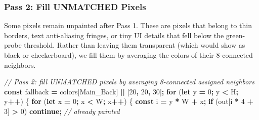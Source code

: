 \documentclass[
  11pt,
  oneside]{report}
\newenvironment{Shaded}{\begin{snugshade}}{\end{snugshade}}
\newcommand{\CommentTok}[1]{\textcolor[rgb]{0.56,0.35,0.01}{\textit{#1}}}
\newcommand{\ControlFlowTok}[1]{\textcolor[rgb]{0.13,0.29,0.53}{\textbf{#1}}}
\newcommand{\DecValTok}[1]{\textcolor[rgb]{0.00,0.00,0.81}{#1}}
\newcommand{\KeywordTok}[1]{\textcolor[rgb]{0.13,0.29,0.53}{\textbf{#1}}}
\newcommand{\NormalTok}[1]{#1}
\newcommand{\OperatorTok}[1]{\textcolor[rgb]{0.81,0.36,0.00}{\textbf{#1}}}
\newcommand{\StringTok}[1]{\textcolor[rgb]{0.31,0.60,0.02}{#1}}
\begin{document}
\subsubsection{Pass 2: Fill UNMATCHED
Pixels}\label{pass-2-fill-unmatched-pixels}

Some pixels remain unpainted after Pass 1. These are pixels that belong
to thin borders, text anti-aliasing fringes, or tiny UI details that
fell below the green-probe threshold. Rather than leaving them
transparent (which would show as black or checkerboard), we fill them by
averaging the colors of their 8-connected neighbors.

\begin{Shaded}
\begin{Highlighting}[]
\CommentTok{// Pass 2: fill UNMATCHED pixels by averaging 8{-}connected assigned neighbors}
\KeywordTok{const}\NormalTok{ fallback }\OperatorTok{=}\NormalTok{ colors[}\StringTok{\textquotesingle{}Main\_Back\textquotesingle{}}\NormalTok{] }\OperatorTok{||}\NormalTok{ [}\DecValTok{20}\OperatorTok{,} \DecValTok{20}\OperatorTok{,} \DecValTok{30}\NormalTok{]}\OperatorTok{;}
\ControlFlowTok{for}\NormalTok{ (}\KeywordTok{let}\NormalTok{ y }\OperatorTok{=} \DecValTok{0}\OperatorTok{;}\NormalTok{ y }\OperatorTok{\textless{}}\NormalTok{ H}\OperatorTok{;}\NormalTok{ y}\OperatorTok{++}\NormalTok{) \{}
  \ControlFlowTok{for}\NormalTok{ (}\KeywordTok{let}\NormalTok{ x }\OperatorTok{=} \DecValTok{0}\OperatorTok{;}\NormalTok{ x }\OperatorTok{\textless{}}\NormalTok{ W}\OperatorTok{;}\NormalTok{ x}\OperatorTok{++}\NormalTok{) \{}
    \KeywordTok{const}\NormalTok{ i }\OperatorTok{=}\NormalTok{ y }\OperatorTok{*}\NormalTok{ W }\OperatorTok{+}\NormalTok{ x}\OperatorTok{;}
    \ControlFlowTok{if}\NormalTok{ (out[i }\OperatorTok{*} \DecValTok{4} \OperatorTok{+} \DecValTok{3}\NormalTok{] }\OperatorTok{\textgreater{}} \DecValTok{0}\NormalTok{) }\ControlFlowTok{continue}\OperatorTok{;} \CommentTok{// already painted}


\end{Highlighting}
\end{Shaded}
\end{document}
